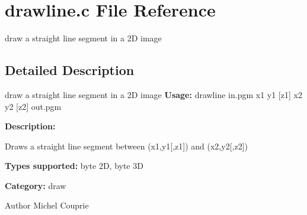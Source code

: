 \section{drawline.c File Reference}
\label{drawline_8c}


draw a straight line segment in a 2D image  




\subsection{Detailed Description}
draw a straight line segment in a 2D image {\bfseries Usage:} drawline in.pgm x1 y1 [z1] x2 y2 [z2] out.pgm

{\bfseries Description:}

Draws a straight line segment between (x1,y1[,z1]) and (x2,y2[,z2])

{\bfseries Types supported:} byte 2D, byte 3D

{\bfseries Category:} draw

\begin{DoxyAuthor}{Author}
Michel Couprie 
\end{DoxyAuthor}
